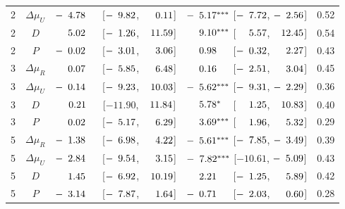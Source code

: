 \begin{longtable}{lcccc}
2 & $\Delta\mu_{U}$ & $-\hphantom{0}4.78^{\hphantom{***}}$ [$-\hphantom{0}9.82$, $\hphantom{-}\hphantom{0}0.11$] & $-\hphantom{0}5.17^{***}$ [$-\hphantom{0}7.72$, $-\hphantom{0}2.56$] & 0.52 \\
2 & $D$ & $\hphantom{-}\hphantom{0}5.02^{\hphantom{***}}$ [$-\hphantom{0}1.26$, $\hphantom{-}11.59$] & $\hphantom{-}\hphantom{0}9.10^{***}$ [$\hphantom{-}\hphantom{0}5.57$, $\hphantom{-}12.45$] & 0.54 \\
2 & $P$ & $-\hphantom{0}0.02^{\hphantom{***}}$ [$-\hphantom{0}3.01$, $\hphantom{-}\hphantom{0}3.06$] & $\hphantom{-}\hphantom{0}0.98^{\hphantom{***}}$ [$-\hphantom{0}0.32$, $\hphantom{-}\hphantom{0}2.27$] & 0.43 \\
3 & $\Delta\mu_{R}$ & $\hphantom{-}\hphantom{0}0.07^{\hphantom{***}}$ [$-\hphantom{0}5.85$, $\hphantom{-}\hphantom{0}6.48$] & $\hphantom{-}\hphantom{0}0.16^{\hphantom{***}}$ [$-\hphantom{0}2.51$, $\hphantom{-}\hphantom{0}3.04$] & 0.45 \\
3 & $\Delta\mu_{U}$ & $-\hphantom{0}0.14^{\hphantom{***}}$ [$-\hphantom{0}9.23$, $\hphantom{-}10.03$] & $-\hphantom{0}5.62^{***}$ [$-\hphantom{0}9.31$, $-\hphantom{0}2.29$] & 0.36 \\
3 & $D$ & $\hphantom{-}\hphantom{0}0.21^{\hphantom{***}}$ [$-11.90$, $\hphantom{-}11.84$] & $\hphantom{-}\hphantom{0}5.78^{*\hphantom{**}}$ [$\hphantom{-}\hphantom{0}1.25$, $\hphantom{-}10.83$] & 0.40 \\
3 & $P$ & $\hphantom{-}\hphantom{0}0.02^{\hphantom{***}}$ [$-\hphantom{0}5.17$, $\hphantom{-}\hphantom{0}6.29$] & $\hphantom{-}\hphantom{0}3.69^{***}$ [$\hphantom{-}\hphantom{0}1.96$, $\hphantom{-}\hphantom{0}5.32$] & 0.29 \\
5 & $\Delta\mu_{R}$ & $-\hphantom{0}1.38^{\hphantom{***}}$ [$-\hphantom{0}6.98$, $\hphantom{-}\hphantom{0}4.22$] & $-\hphantom{0}5.61^{***}$ [$-\hphantom{0}7.85$, $-\hphantom{0}3.49$] & 0.39 \\
5 & $\Delta\mu_{U}$ & $-\hphantom{0}2.84^{\hphantom{***}}$ [$-\hphantom{0}9.54$, $\hphantom{-}\hphantom{0}3.15$] & $-\hphantom{0}7.82^{***}$ [$-10.61$, $-\hphantom{0}5.09$] & 0.43 \\
5 & $D$ & $\hphantom{-}\hphantom{0}1.45^{\hphantom{***}}$ [$-\hphantom{0}6.92$, $\hphantom{-}10.19$] & $\hphantom{-}\hphantom{0}2.21^{\hphantom{***}}$ [$-\hphantom{0}1.25$, $\hphantom{-}\hphantom{0}5.89$] & 0.42 \\
5 & $P$ & $-\hphantom{0}3.14^{\hphantom{***}}$ [$-\hphantom{0}7.87$, $\hphantom{-}\hphantom{0}1.64$] & $-\hphantom{0}0.71^{\hphantom{***}}$ [$-\hphantom{0}2.03$, $\hphantom{-}\hphantom{0}0.60$] & 0.28 \\

\end{longtable}
